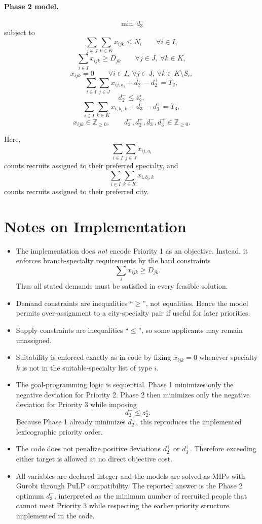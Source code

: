 \paragraph{Phase 2 model.}
\[
\min \ d_3^-
\]
subject to
\[
\sum_{j\in J}\sum_{k\in K} x_{ijk} \le N_i \qquad \forall i\in I,
\]
\[
\sum_{i\in I} x_{ijk} \ge D_{jk} \qquad \forall j\in J,\ \forall k\in K,
\]
\[
x_{ijk}=0 \qquad \forall i\in I,\ \forall j\in J,\ \forall k\in K\setminus S_i,
\]
\[
\sum_{i\in I}\sum_{j\in J} x_{ij,a_i} + d_2^- - d_2^+ = T_2,
\]
\[
d_2^- \le z_2^\star,
\]
\[
\sum_{i\in I}\sum_{k\in K} x_{i,b_i,k} + d_3^- - d_3^+ = T_3,
\]
\[
x_{ijk}\in \mathbb{Z}_{\ge 0},\qquad d_2^-,d_2^+,d_3^-,d_3^+\in \mathbb{Z}_{\ge 0}.
\]

Here,
\[
\sum_{i\in I}\sum_{j\in J} x_{ij,a_i}
\]
counts recruits assigned to their preferred specialty, and
\[
\sum_{i\in I}\sum_{k\in K} x_{i,b_i,k}
\]
counts recruits assigned to their preferred city.

\section*{Notes on Implementation}

\begin{itemize}
\item The implementation does \emph{not} encode Priority 1 as an objective. Instead, it enforces branch-specialty requirements by the hard constraints
\[
\sum_i x_{ijk} \ge D_{jk}.
\]
Thus all stated demands must be satisfied in every feasible solution.

\item Demand constraints are inequalities ``$\ge$'', not equalities. Hence the model permits over-assignment to a city-specialty pair if useful for later priorities.

\item Supply constraints are inequalities ``$\le$'', so some applicants may remain unassigned.

\item Suitability is enforced exactly as in code by fixing $x_{ijk}=0$ whenever specialty $k$ is not in the suitable-specialty list of type $i$.

\item The goal-programming logic is sequential. Phase 1 minimizes only the negative deviation for Priority 2. Phase 2 then minimizes only the negative deviation for Priority 3 while imposing
\[
d_2^- \le z_2^\star.
\]
Because Phase 1 already minimizes $d_2^-$, this reproduces the implemented lexicographic priority order.

\item The code does not penalize positive deviations $d_2^+$ or $d_3^+$. Therefore exceeding either target is allowed at no direct objective cost.

\item All variables are declared integer and the models are solved as MIPs with Gurobi through PuLP compatibility. The reported answer is the Phase 2 optimum $d_3^-$, interpreted as the minimum number of recruited people that cannot meet Priority 3 while respecting the earlier priority structure implemented in the code.
\end{itemize}
